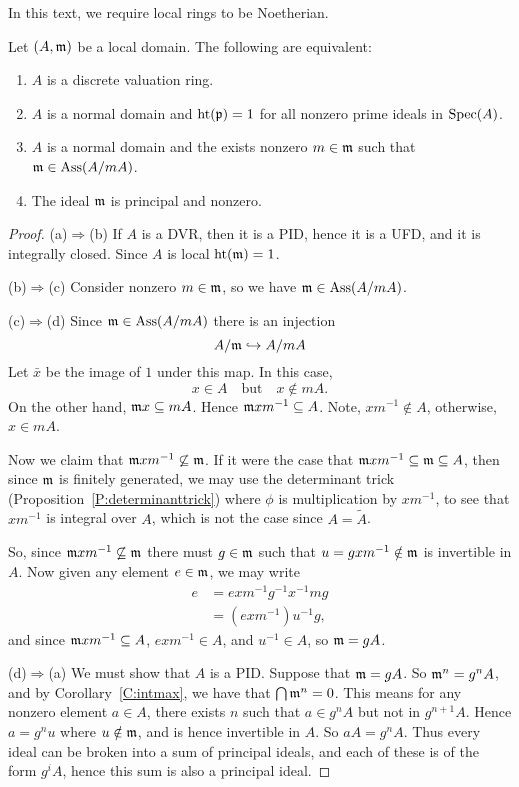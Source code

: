 \documentclass{ximera}
\begin{document}
In this text, we require local rings to be Noetherian.


\begin{proposition}
  Let $(A,\mathfrak{m})$ be a local domain. The following are equivalent:
  \begin{enumerate}
  \item $A$ is a discrete valuation ring.
  \item $A$ is a normal domain and $\operatorname{ht}(\mathfrak{p})= 1$ for all nonzero prime
    ideals in $\operatorname{Spec}(A)$.
  \item $A$ is a normal domain and the exists nonzero $m\in \mathfrak{m}$ such
    that $\mathfrak{m}\in\operatorname{Ass}(A/m A)$.
  \item The ideal $\mathfrak{m}$ is principal and nonzero.
  \end{enumerate}
  \begin{proof}
    (a)$\Rightarrow$(b) If $A$ is a DVR, then it is a PID, hence it is
    a UFD, and it is integrally closed.  Since $A$ is local $\operatorname{ht}(\mathfrak{m}) =
    1$.

    (b)$\Rightarrow$(c) Consider nonzero $m\in \mathfrak{m}$, so we have
    $\mathfrak{m}\in\operatorname{Ass}(A/m A)$.

    (c)$\Rightarrow$(d) Since $\mathfrak{m}\in\operatorname{Ass}(A/m A)$ there is an injection
    \[
    A/\mathfrak{m} \hookrightarrow A/m A
    \]
    Let $\bar{x}$ be the image of $1$ under this map. In this case,
    \[
    x\in A \quad\text{but}\quad x\notin m A.
    \]
    On the other hand, $\mathfrak{m} x \subseteq m A$. Hence $\mathfrak{m} x m^{-1} \subseteq
    A$. Note, $xm^{-1}\notin A$, otherwise, $x\in mA$.

    Now we claim that $\mathfrak{m} xm^{-1}\not\subseteq\mathfrak{m}$. If it were the case
    that $\mathfrak{m} xm^{-1}\subseteq \mathfrak{m}\subseteq A$, then since $\mathfrak{m}$ is finitely
    generated, we may use the determinant trick
    (Proposition~\ref{P:determinanttrick}) where $\phi$ is
    multiplication by $xm^{-1}$, to see that $xm^{-1}$ is integral
    over $A$, which is not the case since $A = \tilde{A}$.

    So, since $\mathfrak{m} xm^{-1} \not\subseteq\mathfrak{m}$ there must $g\in \mathfrak{m}$ such
    that $u = gxm^{-1}\notin\mathfrak{m}$ is invertible in $A$.  Now given any
    element $e\in\mathfrak{m}$, we may write
    \begin{align*}
      e &= e xm^{-1} g^{-1} x^{-1} m g \\
      &= (exm^{-1}) u^{-1} g,
    \end{align*}
    and since $\mathfrak{m} xm^{-1}\subseteq A$, $exm^{-1}\in A$, and $u^{-1}\in
    A$, so $\mathfrak{m} = g A$.

    (d)$\Rightarrow$(a) We must show that $A$ is a PID. Suppose that
    $\mathfrak{m} = gA$. So $\mathfrak{m}^n = g^n A$, and by Corollary~\ref{C:intmax}, we
    have that $\bigcap \mathfrak{m}^n = 0$. This means for any nonzero element
    $a\in A$, there exists $n$ such that $a\in g^n A$ but not in
    $g^{n+1}A$. Hence $a = g^nu$ where $u\notin\mathfrak{m}$, and is hence
    invertible in $A$. So $a A = g^n A$. Thus every ideal can be
    broken into a sum of principal ideals, and each of these is of
    the form $g^i A$, hence this sum is also a principal ideal.
  \end{proof}
\end{proposition}
\end{document}
